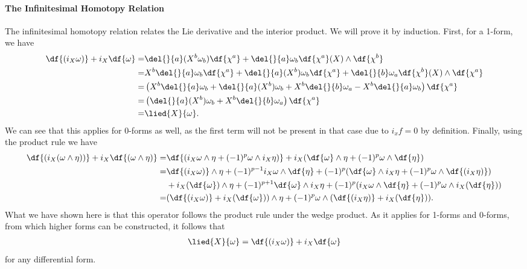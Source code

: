 \paragraph{The Infinitesimal Homotopy Relation}
The infinitesimal homotopy relation relates the Lie derivative and the interior product. We will prove it by induction. First, for a 1-form, we have
\begin{align*}
	\df{(i_{X}\omega)} + i_{X}\df{\omega} =& \del{}{a}(X^{b}\omega_{b})\df{\chi^{a}} + \del{}{a}\omega_{b}\df{\chi^{a}}(X)\wedge\df{\chi^{b}} \\
	=& X^{b}\del{}{a}\omega_{b}\df{\chi^{a}} + \del{}{a}(X^{b})\omega_{b}\df{\chi^{a}} + \del{}{b}\omega_{a}\df{\chi^{b}}(X)\wedge\df{\chi^{a}} \\
	=& \left(X^{b}\del{}{a}\omega_{b} + \del{}{a}(X^{b})\omega_{b} + X^{b}\del{}{b}\omega_{a} - X^{b}\del{}{a}\omega_{b}\right)\df{\chi^{a}} \\
	=& \left(\del{}{a}(X^{b})\omega_{b} + X^{b}\del{}{b}\omega_{a}	\right)\df{\chi^{a}} \\
	=& \lied{X}{\omega}.
\end{align*}
We can see that this applies for 0-forms as well, as the first term will not be present in that case due to $i_{x}f = 0$ by definition. Finally, using the product rule we have
\begin{align*}
	\df{(i_{X}(\omega\wedge\eta))} + i_{X}\df{(\omega\wedge\eta)} =& \df{(i_{X}\omega\wedge\eta + (-1)^{p}\omega\wedge i_{X}\eta)} + i_{X}(\df{\omega}\wedge\eta + (-1)^{p}\omega\wedge\df{\eta}) \\
	=& \df{(i_{X}\omega)}\wedge\eta + (-1)^{p - 1}i_{X}\omega\wedge\df{\eta} + (-1)^{p}(\df{\omega}\wedge i_{X}\eta + (-1)^{p}\omega\wedge\df{(i_{X}\eta)}) \\
	 &+ i_{X}(\df{\omega})\wedge\eta + (-1)^{p + 1}\df{\omega}\wedge i_{X}\eta + (-1)^{p}(i_{X}\omega\wedge\df{\eta} + (-1)^{p}\omega\wedge i_{X}(\df{\eta})) \\
	=& (\df{(i_{X}\omega)} + i_{X}(\df{\omega}))\wedge\eta + (-1)^{p}\omega\wedge(\df{(i_{X}\eta)} + i_{X}(\df{\eta})).
\end{align*}
What we have shown here is that this operator follows the product rule under the wedge product. As it applies for 1-forms and 0-forms, from which higher forms can be constructed, it follows that
\begin{align*}
	\lied{X}{\omega} = \df{(i_{X}\omega)} + i_{X}\df{\omega}
\end{align*}
for any differential form.

